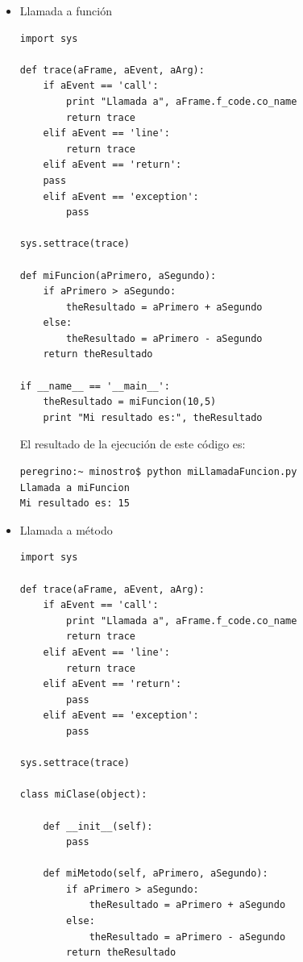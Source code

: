 \documentclass[12pt,legalpaper]{report}
\begin{document}
\begin{itemize}
	\item{Llamada a función}

\begin{singlespace}
\begin{lstlisting}[style=Python]
import sys

def trace(aFrame, aEvent, aArg):
    if aEvent == 'call':
        print "Llamada a", aFrame.f_code.co_name
        return trace
    elif aEvent == 'line':
        return trace
    elif aEvent == 'return':
	pass
    elif aEvent == 'exception':
        pass

sys.settrace(trace)

def miFuncion(aPrimero, aSegundo):
    if aPrimero > aSegundo:
        theResultado = aPrimero + aSegundo
    else:
        theResultado = aPrimero - aSegundo
    return theResultado

if __name__ == '__main__':
    theResultado = miFuncion(10,5)
    print "Mi resultado es:", theResultado
\end{lstlisting}
\end{singlespace}


El resultado de la ejecución de este código es:

\begin{singlespace}
\begin{lstlisting}[style=consola,numbers=none]
peregrino:~ minostro$ python miLlamadaFuncion.py
Llamada a miFuncion
Mi resultado es: 15
\end{lstlisting}
\end{singlespace}

	
	\item{Llamada a método}

\begin{singlespace}
\begin{lstlisting}[style=Python]
import sys

def trace(aFrame, aEvent, aArg):
    if aEvent == 'call':
        print "Llamada a", aFrame.f_code.co_name
        return trace
    elif aEvent == 'line':
        return trace
    elif aEvent == 'return':
        pass
    elif aEvent == 'exception':
        pass

sys.settrace(trace)

class miClase(object):
    
    def __init__(self):
        pass
    
    def miMetodo(self, aPrimero, aSegundo):
        if aPrimero > aSegundo:
            theResultado = aPrimero + aSegundo
        else:
            theResultado = aPrimero - aSegundo
        return theResultado


\end{lstlisting}
\end{singlespace}
\end{itemize}
\end{document}
